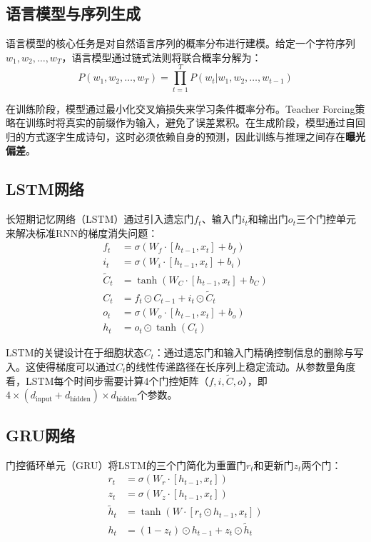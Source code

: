 \documentclass[12pt,a4paper]{article}
\begin{document}
\subsection{语言模型与序列生成}

语言模型的核心任务是对自然语言序列的概率分布进行建模。给定一个字符序列$w_1, w_2, \ldots, w_T$，语言模型通过链式法则将联合概率分解为：
\begin{equation}
    P(w_1, w_2, \ldots, w_T) = \prod_{t=1}^{T} P(w_t | w_1, w_2, \ldots, w_{t-1})
\end{equation}

在训练阶段，模型通过最小化交叉熵损失来学习条件概率分布。Teacher Forcing策略在训练时将真实的前缀作为输入，避免了误差累积。在生成阶段，模型通过自回归的方式逐字生成诗句，这时必须依赖自身的预测，因此训练与推理之间存在\textbf{曝光偏差}。

\subsection{LSTM网络}

长短期记忆网络（LSTM）通过引入遗忘门$f_t$、输入门$i_t$和输出门$o_t$三个门控单元来解决标准RNN的梯度消失问题：
\begin{align}
    f_t &= \sigma(W_f \cdot [h_{t-1}, x_t] + b_f) \\
    i_t &= \sigma(W_i \cdot [h_{t-1}, x_t] + b_i) \\
    \tilde{C}_t &= \tanh(W_C \cdot [h_{t-1}, x_t] + b_C) \\
    C_t &= f_t \odot C_{t-1} + i_t \odot \tilde{C}_t \\
    o_t &= \sigma(W_o \cdot [h_{t-1}, x_t] + b_o) \\
    h_t &= o_t \odot \tanh(C_t)
\end{align}

LSTM的关键设计在于细胞状态$C_t$：通过遗忘门和输入门精确控制信息的删除与写入。这使得梯度可以通过$C_t$的线性传递路径在长序列上稳定流动。从参数量角度看，LSTM每个时间步需要计算4个门控矩阵（$f, i, \tilde{C}, o$），即$4 \times (d_{\text{input}} + d_{\text{hidden}}) \times d_{\text{hidden}}$个参数。

\subsection{GRU网络}

门控循环单元（GRU）将LSTM的三个门简化为重置门$r_t$和更新门$z_t$两个门：
\begin{align}
    r_t &= \sigma(W_r \cdot [h_{t-1}, x_t]) \\
    z_t &= \sigma(W_z \cdot [h_{t-1}, x_t]) \\
    \tilde{h}_t &= \tanh(W \cdot [r_t \odot h_{t-1}, x_t]) \\
    h_t &= (1 - z_t) \odot h_{t-1} + z_t \odot \tilde{h}_t
\end{align}
\end{document}
